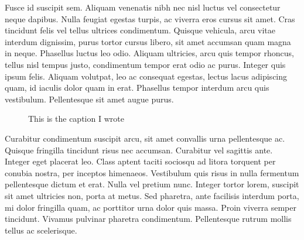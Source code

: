 Fusce id suscipit sem. Aliquam venenatis nibh nec nisl luctus vel consectetur neque dapibus. Nulla feugiat egestas turpis, ac viverra eros cursus sit amet. Cras tincidunt felis vel tellus ultrices condimentum. Quisque vehicula, arcu vitae interdum dignissim, purus tortor cursus libero, sit amet accumsan quam magna in neque. Phasellus luctus leo odio. Aliquam ultricies, arcu quis tempor rhoncus, tellus nisl tempus justo, condimentum tempor erat odio ac purus. Integer quis ipsum felis. Aliquam volutpat, leo ac consequat egestas, lectus lacus adipiscing quam, id iaculis dolor quam in erat. Phasellus tempor interdum arcu quis vestibulum. Pellentesque sit amet augue purus. 
\begin{figure}[htbp]
    \centering
    \caption{This is the caption I wrote}
    \label{fig:label}
\end{figure}
Curabitur condimentum suscipit arcu, sit amet convallis urna pellentesque ac. Quisque fringilla tincidunt risus nec accumsan. Curabitur vel sagittis ante. Integer eget placerat leo. Class aptent taciti sociosqu ad litora torquent per conubia nostra, per inceptos himenaeos. Vestibulum quis risus in nulla fermentum pellentesque dictum et erat. Nulla vel pretium nunc. Integer tortor lorem, suscipit sit amet ultricies non, porta at metus. Sed pharetra, ante facilisis interdum porta, mi dolor fringilla quam, ac porttitor urna dolor quis massa. Proin viverra semper tincidunt. Vivamus pulvinar pharetra condimentum. Pellentesque rutrum mollis tellus ac scelerisque.
